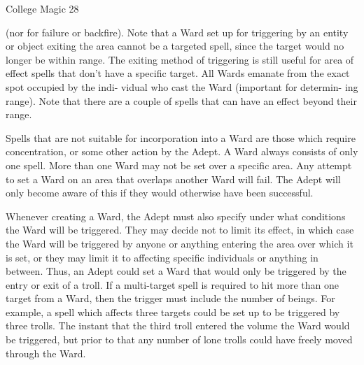 \begin{Chapter}{College Magic}
28 

(nor  for  failure  or  backfire).  Note  that  a  Ward  set 
up  for  triggering  by  an  entity  or  object  exiting the 
area  cannot  be  a  targeted  spell,  since  the  target 
would  no  longer  be  within  range.  The  exiting 
method of triggering is still useful for area of effect 
spells  that  don’t  have  a  specific  target.  All  Wards 
emanate from the  exact spot occupied by the indi-
vidual who cast the Ward (important for determin-
ing  range).  Note  that  there  are  a  couple  of  spells 
that can have an effect beyond their range. 

Spells that are not suitable for incorporation into a 
Ward  are  those  which  require  concentration,  or 
some  other  action  by  the  Adept.  A  Ward  always 
consists  of  only  one  spell.  More  than  one  Ward 
may not be set over a specific area. Any attempt to 
set  a  Ward  on  an  area  that  overlaps  another  Ward 
will fail. The Adept will only become aware of this 
if they would otherwise have been successful. 

Whenever  creating  a  Ward,  the  Adept  must  also 
specify  under  what  conditions  the  Ward  will  be 
triggered.  They  may  decide  not  to  limit  its  effect, 
in which case the Ward will be triggered by anyone 
or anything entering the area over which it is set, or 
they may limit it to affecting specific individuals or 
anything  in  between.  Thus,  an  Adept  could  set  a 
Ward that would only be triggered by the entry or 
exit  of  a  troll.  If  a  multi-target  spell  is  required  to 
hit  more  than  one  target  from  a  Ward,  then  the 
trigger  must  include  the  number  of  beings.  For 
example,  a  spell  which  affects  three  targets  could 
be set up to be triggered by three trolls. The instant 
that  the  third  troll  entered  the  volume  the  Ward 
would be triggered, but prior to that any number of 
lone  trolls  could  have  freely  moved  through  the 
Ward. 


\end{Chapter}
